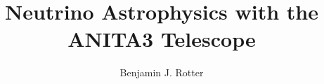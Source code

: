 \documentclass[11pt]{uhthesis}
\title{Neutrino Astrophysics with the ANITA3 Telescope}
\author{Benjamin J. Rotter}
\begin{document}
\maketitle

\begin{frontmatter}



%

%



\tableofcontents



\end{frontmatter}




%


%
%
%
\end{document}
